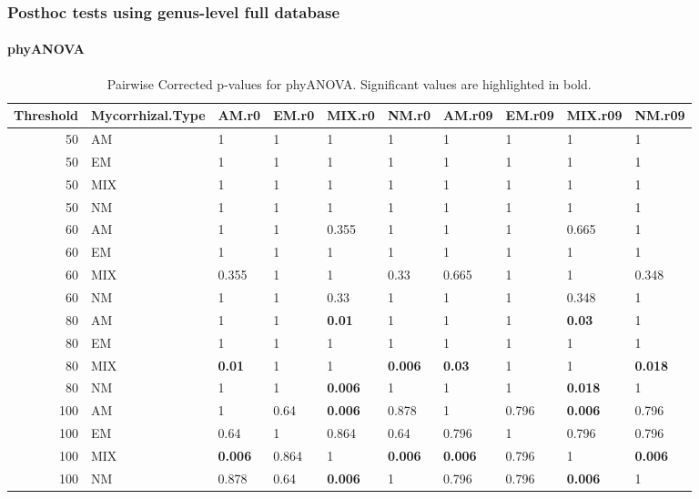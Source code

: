 \documentclass[]{article}
\let\oldparagraph\paragraph
\renewcommand{\paragraph}[1]{\oldparagraph{#1}\mbox{}}
\begin{document}
\hypertarget{posthoc-tests-using-genus-level-full-database}{%
\subsubsection{Posthoc tests using genus-level full
database}\label{posthoc-tests-using-genus-level-full-database}}

\hypertarget{phyanova-7}{%
\paragraph{phyANOVA}\label{phyanova-7}}

\begin{table}[H]

\caption{\label{tab:unnamed-chunk-32}Pairwise Corrected p-values for phyANOVA. Significant values are highlighted in bold.}
\centering
\begin{tabular}{r|l|l|l|l|l|l|l|l|l}
\hline
Threshold & Mycorrhizal.Type & AM.r0 & EM.r0 & MIX.r0 & NM.r0 & AM.r09 & EM.r09 & MIX.r09 & NM.r09\\
\hline
50 & AM & 1 & 1 & 1 & 1 & 1 & 1 & 1 & 1\\
\hline
50 & EM & 1 & 1 & 1 & 1 & 1 & 1 & 1 & 1\\
\hline
50 & MIX & 1 & 1 & 1 & 1 & 1 & 1 & 1 & 1\\
\hline
50 & NM & 1 & 1 & 1 & 1 & 1 & 1 & 1 & 1\\
\hline
60 & AM & 1 & 1 & 0.355 & 1 & 1 & 1 & 0.665 & 1\\
\hline
60 & EM & 1 & 1 & 1 & 1 & 1 & 1 & 1 & 1\\
\hline
60 & MIX & 0.355 & 1 & 1 & 0.33 & 0.665 & 1 & 1 & 0.348\\
\hline
60 & NM & 1 & 1 & 0.33 & 1 & 1 & 1 & 0.348 & 1\\
\hline
80 & AM & 1 & 1 & \textbf{0.01} & 1 & 1 & 1 & \textbf{0.03} & 1\\
\hline
80 & EM & 1 & 1 & 1 & 1 & 1 & 1 & 1 & 1\\
\hline
80 & MIX & \textbf{0.01} & 1 & 1 & \textbf{0.006} & \textbf{0.03} & 1 & 1 & \textbf{0.018}\\
\hline
80 & NM & 1 & 1 & \textbf{0.006} & 1 & 1 & 1 & \textbf{0.018} & 1\\
\hline
100 & AM & 1 & 0.64 & \textbf{0.006} & 0.878 & 1 & 0.796 & \textbf{0.006} & 0.796\\
\hline
100 & EM & 0.64 & 1 & 0.864 & 0.64 & 0.796 & 1 & 0.796 & 0.796\\
\hline
100 & MIX & \textbf{0.006} & 0.864 & 1 & \textbf{0.006} & \textbf{0.006} & 0.796 & 1 & \textbf{0.006}\\
\hline
100 & NM & 0.878 & 0.64 & \textbf{0.006} & 1 & 0.796 & 0.796 & \textbf{0.006} & 1\\
\hline
\end{tabular}
\end{table}
\end{document}
